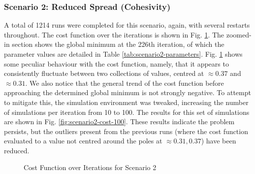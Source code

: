 \documentclass[12pt]{article}
\begin{document}
\subsubsection{Scenario 2: Reduced Spread (Cohesivity)}
A total of 1214 runs were completed for this scenario, again, with several restarts throughout. The cost function over the iterations is shown in Fig. \ref{fig:scenario2-cost}. The zoomed-in section shows the global minimum at the 226th iteration, of which the parameter values are detailed in Table \ref{tab:scenario2-parameters}. Fig. \ref{fig:scenario2-cost} shows some peculiar behaviour with the cost function, namely, that it appears to consistently fluctuate between two collections of values, centred at $\approx 0.37$ and $\approx 0.31$. We also notice that the general trend of the cost function before approaching the determined global minimum is not strongly negative. To attempt to mitigate this, the simulation environment was tweaked, increasing the number of simulations per iteration from 10 to 100. The results for this set of simulations are shown in Fig. \ref{fig:scenario2-cost-100}. These results indicate the problem persists, but the outliers present from the previous runs (where the cost function evaluated to a value not centred around the poles at $\approx 0.31, 0.37$) have been reduced.

\begin{figure}[ht]

    \centering
    \begin{subfigure}{.4\textwidth}
    \end{subfigure}
    \hfill
    \begin{subfigure}{.4\textwidth}
    \end{subfigure}
    \caption{Cost Function over Iterations for Scenario 2}
    \label{fig:scenario2-cost}

\end{figure}
\end{document}
